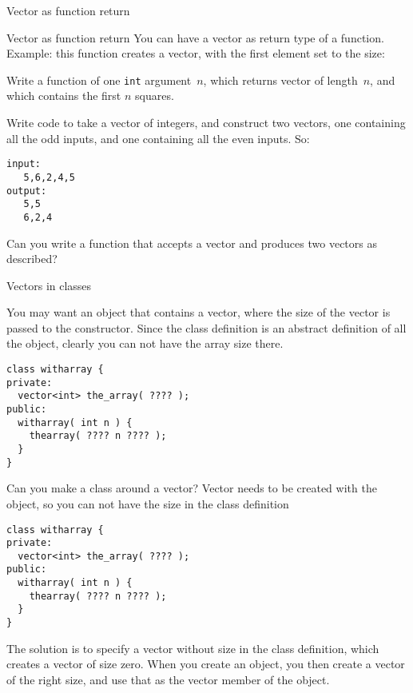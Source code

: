  {Vector as function return}

\begin{block}{Vector as function return}
  \label{sl:vector-return}
  You can have a vector as return type of a function.\\
  Example: this function
  creates a vector, with the first element set to the size:
\end{block}

\begin{exercise}
  \label{ex:vec-of-squares}
  Write a function of one \lstinline{int} argument~$n$, which returns vector
  of length~$n$, and which contains the first $n$ squares.
\end{exercise}

\begin{exercise}
  \label{ex:splitoddeven}
  Write code to take a vector of integers, and construct two
  vectors, one containing all the odd inputs, and one containing all
  the even inputs. So:
\begin{lstlisting}
input:
   5,6,2,4,5
output:
   5,5
   6,2,4
\end{lstlisting}
  Can you write a function that accepts a vector and produces two
  vectors as described?
\end{exercise}

 {Vectors in classes}

You may want an object that contains a vector, where the size of the
vector is passed to the constructor. Since the class definition is an
abstract definition of all the object, clearly you can not have the
array size there.

\begin{lstlisting}
class witharray {
private:
  vector<int> the_array( ???? );
public:
  witharray( int n ) {
    thearray( ???? n ???? );
  }
}
\end{lstlisting}

\begin{slide}{Can you make a class around a vector?}
  \label{sl:class-with-vector}
  Vector needs to be created with the object, so you can not have the
  size in the class definition
\begin{lstlisting}
class witharray {
private:
  vector<int> the_array( ???? );
public:
  witharray( int n ) {
    thearray( ???? n ???? );
  }
}
\end{lstlisting}
\end{slide}

The solution is to specify a vector without size in the class
definition, which creates a vector of size zero. When you create an
object, you then create a vector of the right size, and use that as
the vector member of the object.

